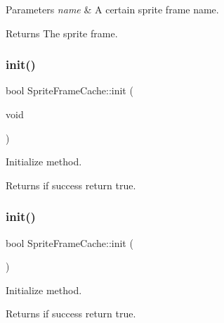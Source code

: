 \begin{DoxyParams}{Parameters}
{\em name} & A certain sprite frame name. \\
\hline
\end{DoxyParams}
\begin{DoxyReturn}{Returns}
The sprite frame. 
\end{DoxyReturn}
\mbox{\label{classSpriteFrameCache_a45438c56c17c4def48da6ee790c23c0e}} 
\subsubsection{\texorpdfstring{init()}{init()}\hspace{0.1cm}{\footnotesize\ttfamily [1/2]}}
{\footnotesize\ttfamily bool Sprite\+Frame\+Cache\+::init (\begin{DoxyParamCaption}\item[{void}]{ }\end{DoxyParamCaption})}

Initialize method.

\begin{DoxyReturn}{Returns}
if success return true. 
\end{DoxyReturn}
\mbox{\label{classSpriteFrameCache_a45438c56c17c4def48da6ee790c23c0e}} 
\subsubsection{\texorpdfstring{init()}{init()}\hspace{0.1cm}{\footnotesize\ttfamily [2/2]}}
{\footnotesize\ttfamily bool Sprite\+Frame\+Cache\+::init (\begin{DoxyParamCaption}{ }\end{DoxyParamCaption})}

Initialize method.

\begin{DoxyReturn}{Returns}
if success return true. 
\end{DoxyReturn}
\mbox{\label{classSpriteFrameCache_a3b4d6f3e1281bc0251699b156cf0b680}} 
